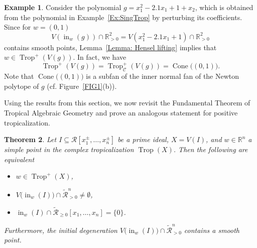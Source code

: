 \documentclass{article}
\newtheorem{theorem}{Theorem}[section]
\theoremstyle{definition}
\newtheorem{example}[theorem]{Example}
\DeclareMathOperator{\initial}{in}
\DeclareMathOperator{\Trop}{Trop}
\DeclareMathOperator{\Cone}{Cone}
\newcommand{\inw}{\operatorname{in}_w}
\begin{document}
\begin{example}
\label{Example::SignedvsWeakSigned}
Consider the polynomial $g = x_1^2 - 2.1x_1 +1 +x_2$, which is obtained from the polynomial in Example~\ref{Ex:SingTrop} by perturbing its coefficients. Since for $w = (0,1)$
\[V(\inw(g)) \cap \mathbb{R}_{>0}^2 =  V(x_1^2 - 2.1x_1 +1) \cap \mathbb{R}_{>0}^2 \]
contains smooth points, Lemma~\ref{Lemma: Hensel lifting} implies that $w \in \Trop^+(V(g))$. In fact, we have
\[\Trop^+(V(g)) = \Trop^+_\mathcal{C}(V(g)) = \Cone\big( (0,1)\big).\]
Note that $\Cone\big( (0,1)\big)$ is a subfan of the inner normal fan of the Newton polytope of $g$ (cf. Figure~\ref{FIG1}(b)).
\end{example}


Using the results from this section, we now revisit the Fundamental Theorem of Tropical Algebraic Geometry and prove an analogous statement for positive tropicalization.


\begin{theorem}
\label{thm: multiplicity one cones are positive}
        Let $I \subseteq \mathcal{R}[x_1^\pm, \dots, x_n^\pm]$ be a  prime ideal, $X = V(I)$, and $w\in \mathbb{R}^n$ a simple point in the complex tropicalization $\Trop(X)$. Then the following are equivalent
        \begin{itemize}
    \item[(i)] $ w \in \Trop^+(X)$,
    \item[(ii)] $V\big( \initial_w(I) \big) \cap \widetilde{\mathcal{R}}^{n}_{>0} \neq \emptyset$,
    \item[(iii)] $\initial_w(I) \cap \widetilde{\mathcal{R}}_{\geq 0}[x_1, \dots , x_n] = \{ 0 \} $.
        \end{itemize}
        Furthermore, the initial degeneration $V\big( \initial_w(I) \big) \cap \widetilde{\mathcal{R}}^{n}_{>0}$ contains a smooth point.
\end{theorem}
\end{document}
